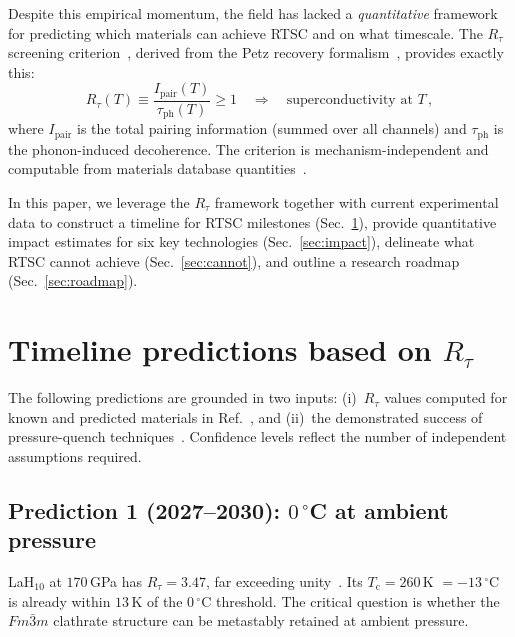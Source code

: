 \documentclass[prl,twocolumn,superscriptaddress,longbibliography,floatfix]{revtex4-2}
\newcommand{\tauasym}{\tau}
\newcommand{\taudec}{\tauasym_{\mathrm{ph}}}
\newcommand{\Ipair}{I_{\mathrm{pair}}}
\newcommand{\Rtau}{R_{\tauasym}}
\newcommand{\Tc}{T_{\mathrm{c}}}
\begin{document}
Despite this empirical momentum, the field has lacked a
\emph{quantitative} framework for predicting which materials
can achieve RTSC and on what timescale.  The $\Rtau$ screening
criterion~\cite{HuangRTSC2026}, derived from the Petz recovery
formalism~\cite{Huang2026,Petz1988}, provides exactly this:
\begin{equation}\label{eq:Rtau}
  \Rtau(T) \equiv \frac{\Ipair(T)}{\taudec(T)} \geq 1
  \quad\Longrightarrow\quad \text{superconductivity at $T$}\,,
\end{equation}
where $\Ipair$ is the total pairing information (summed over
all channels) and $\taudec$ is the phonon-induced decoherence.
The criterion is mechanism-independent and computable from
materials database quantities~\cite{HuangRTSC2026}.

In this paper, we leverage the $\Rtau$ framework together with
current experimental data to construct a timeline for RTSC
milestones (Sec.~\ref{sec:timeline}), provide quantitative
impact estimates for six key technologies
(Sec.~\ref{sec:impact}), delineate what RTSC cannot achieve
(Sec.~\ref{sec:cannot}), and outline a research roadmap
(Sec.~\ref{sec:roadmap}).

\section{Timeline predictions based on $\Rtau$}
\label{sec:timeline}

The following predictions are grounded in two inputs:
(i)~$\Rtau$ values computed for known and predicted materials
in Ref.~\cite{HuangRTSC2026}, and (ii)~the demonstrated
success of pressure-quench techniques~\cite{DengChu2026}.
Confidence levels reflect the number of independent assumptions
required.

\subsection{Prediction 1 (2027--2030): $0\,^\circ$C at ambient pressure}

LaH$_{10}$ at $170\,$GPa has $\Rtau = 3.47$, far exceeding
unity~\cite{HuangRTSC2026}.  Its $\Tc = 260\,$K $= -13\,^\circ$C
is already within $13\,$K of the $0\,^\circ$C threshold.  The
critical question is whether the $Fm\bar{3}m$ clathrate
structure can be metastably retained at ambient pressure.
\end{document}
